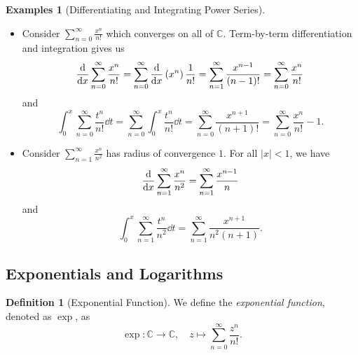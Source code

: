 \documentclass[11pt]{article}
\numberwithin{equation}{section}
\theoremstyle{definition}
\newtheorem{definition}[theorem]{Definition}
\newtheorem{examples}[theorem]{Examples}
\theoremstyle{remark}
\newcommand{\pqty}[1]{\left(#1\right)}
\newcommand{\abs}[1]{\left|#1\right|}
\newcommand{\function}[5]{#1:#2\to #3,\quad #4\mapsto #5}
\newcommand{\CC}{\mathbb C}
\begin{document}
\begin{examples}[Differentiating and Integrating Power Series]\label{analysis-unit-0216}
    \label{ex:differentiating-integrating-power-series}%
    \begin{itemize}
        \item Consider \(\sum_{n = 0}^{\infty} \frac{x^n}{n!}\) which converges on all of \(\CC\). Term-by-term differentiation and integration gives us
        \[
            \dv{x} \sum_{n = 0}^{\infty} \frac{x^n}{n!} = \sum_{n = 0}^{\infty} \dv{x} \pqty{x^n} \frac{1}{n!} = \sum_{n = 1}^{\infty} \frac{x^{n - 1}}{\pqty{n - 1}!} = \sum_{n = 0}^{\infty} \frac{x^n}{n!}
        \]
        and
        \[
            \int_{0}^{x} \sum_{n = 0}^{\infty} \frac{t^n}{n!} \dd{t} = \sum_{n = 0}^{\infty} \int_{0}^{x} \frac{t^n}{n!} \dd{t} = \sum_{n = 0}^{\infty} \frac{x^{n + 1}}{\pqty{n + 1}!} = \sum_{n = 0}^{\infty} \frac{x^n}{n!} - 1.
        \]
        \item Consider \(\sum_{n = 1}^{\infty} \frac{x^n}{n^2}\) has radius of convergence \(1\). For all \(\abs{x} < 1\), we have
        \[
            \dv{x} \sum_{n = 1}^{\infty} \frac{x^n}{n^2} = \sum_{n = 1}^{\infty} \frac{x^{n - 1}}{n}
        \]
        and
        \[
            \int_{0}^{x} \sum_{n = 1}^{\infty} \frac{t^n}{n^2} \dd{t} = \sum_{n = 1}^{\infty} \frac{x^{n + 1}}{n^2 \pqty{n + 1}}.
        \]
    \end{itemize}
\end{examples}

\subsection{Exponentials and Logarithms}

\begin{definition}[Exponential Function]\label{analysis-unit-0217}
    \label{def:exponential-function}%
    We define the \emph{exponential function}, denoted as \(\exp\), as
    \[
        \function{\exp}{\CC}{\CC}{z}{\sum_{n = 0}^{\infty} \frac{z^n}{n!}.}
    \]
\end{definition}
\end{document}

